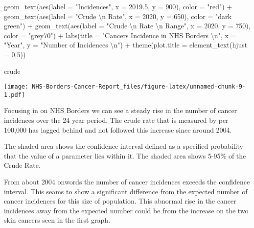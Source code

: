 \documentclass[
]{article}
\newenvironment{Shaded}{\begin{snugshade}}{\end{snugshade}}
\newcommand{\AttributeTok}[1]{\textcolor[rgb]{0.77,0.63,0.00}{#1}}
\newcommand{\DecValTok}[1]{\textcolor[rgb]{0.00,0.00,0.81}{#1}}
\newcommand{\FloatTok}[1]{\textcolor[rgb]{0.00,0.00,0.81}{#1}}
\newcommand{\FunctionTok}[1]{\textcolor[rgb]{0.00,0.00,0.00}{#1}}
\newcommand{\NormalTok}[1]{#1}
\newcommand{\SpecialCharTok}[1]{\textcolor[rgb]{0.00,0.00,0.00}{#1}}
\newcommand{\StringTok}[1]{\textcolor[rgb]{0.31,0.60,0.02}{#1}}
\begin{document}
\begin{Shaded}
\begin{Highlighting}[]
  \FunctionTok{geom\_text}\NormalTok{(}\FunctionTok{aes}\NormalTok{(}\AttributeTok{label =} \StringTok{"Incidences"}\NormalTok{, }\AttributeTok{x =} \FloatTok{2019.5}\NormalTok{, }\AttributeTok{y =} \DecValTok{900}\NormalTok{), }\AttributeTok{color =} \StringTok{"red"}\NormalTok{) }\SpecialCharTok{+}
  \FunctionTok{geom\_text}\NormalTok{(}\FunctionTok{aes}\NormalTok{(}\AttributeTok{label =} \StringTok{"Crude }\SpecialCharTok{\textbackslash{}n}\StringTok{ Rate"}\NormalTok{, }\AttributeTok{x =} \DecValTok{2020}\NormalTok{, }\AttributeTok{y =} \DecValTok{650}\NormalTok{), }\AttributeTok{color =} \StringTok{"dark green"}\NormalTok{) }\SpecialCharTok{+}
  \FunctionTok{geom\_text}\NormalTok{(}\FunctionTok{aes}\NormalTok{(}\AttributeTok{label =} \StringTok{"Crude }\SpecialCharTok{\textbackslash{}n}\StringTok{ Rate }\SpecialCharTok{\textbackslash{}n}\StringTok{ Range"}\NormalTok{, }\AttributeTok{x =} \DecValTok{2020}\NormalTok{, }\AttributeTok{y =} \DecValTok{750}\NormalTok{), }\AttributeTok{color =} \StringTok{"grey70"}\NormalTok{) }\SpecialCharTok{+}
  \FunctionTok{labs}\NormalTok{(}\AttributeTok{title =} \StringTok{"Cancers Incidence in NHS Borders }\SpecialCharTok{\textbackslash{}n}\StringTok{"}\NormalTok{,}
       \AttributeTok{x =} \StringTok{"Year"}\NormalTok{,}
       \AttributeTok{y =} \StringTok{"Number of Incidences }\SpecialCharTok{\textbackslash{}n}\StringTok{"}\NormalTok{) }\SpecialCharTok{+}
  \FunctionTok{theme}\NormalTok{(}\AttributeTok{plot.title =} \FunctionTok{element\_text}\NormalTok{(}\AttributeTok{hjust =} \FloatTok{0.5}\NormalTok{))}
  
\NormalTok{crude}
\end{Highlighting}
\end{Shaded}

\texttt{[image: NHS-Borders-Cancer-Report\_files/figure-latex/unnamed-chunk-9-1.pdf]}

Focusing in on NHS Borders we can see a steady rise in the number of
cancer incidences over the 24 year period. The crude rate that is
measured by per 100,000 has lagged behind and not followed this increase
since around 2004.

The shaded area shows the confidence interval defined as a specified
probability that the value of a parameter lies within it. The shaded
area shows 5-95\% of the Crude Rate.

From about 2004 onwords the number of cancer incidences exceeds the
confidence interval. This seams to show a significant difference from
the expected number of cancer incidences for this size of population.
This abnormal rise in the cancer incidences away from the expected
number could be from the increase on the two skin cancers seen in the
first graph.
\end{document}
